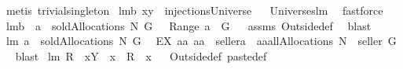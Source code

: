 \begin{isabellebody}
\ {\isacharparenleft}metis\ trivial{\isacharunderscore}singleton{\isacharparenright}%
\endisatagproof
{\isafoldproof}%
%
\isadelimproof
%
\endisadelimproof
\isanewline
{}\isamarkupfalse%
\ lm{}{}b{\isacharcolon}\ {\isachardoublequoteopen}{\isacharbraceleft}x{\isacharbraceright}{\isasymtimes}{\isacharbraceleft}y{\isacharbraceright}\ {\isasymin}\ injectionsUniverse{\isachardoublequoteclose}%
\isadelimproof
\ %
\endisadelimproof
%
\isatagproof
{}\isamarkupfalse%
\ Universes{\isachardot}lm{}{}\ \isamarkupfalse%
\ fastforce%
\endisatagproof
{\isafoldproof}%
%
\isadelimproof
%
\endisadelimproof
\isanewline
{}\isamarkupfalse%
\ lm{}{}b{\isacharcolon}\ \ {\isachardoublequoteopen}a\ {\isasymin}\ soldAllocations{\isacharprime}{\isacharprime}\ N\ G{\isachardoublequoteclose}\ \ {\isachardoublequoteopen}{\isasymUnion}\ Range\ a\ {\isasymsubseteq}\ G{\isachardoublequoteclose}%
\isadelimproof
\ %
\endisadelimproof
%
\isatagproof
{}\isamarkupfalse%
\ assms\ Outside{\isacharunderscore}def\ \isamarkupfalse%
\ blast%
\endisatagproof
{\isafoldproof}%
%
\isadelimproof
%
\endisadelimproof
\isanewline
{}\isamarkupfalse%
\ lm{}{}{\isacharcolon}\ {\isachardoublequoteopen}a\ {\isasymin}\ soldAllocations{\isacharprime}{\isacharprime}\ N\ G\ {\isacharequal}\ \isanewline
{\isacharparenleft}EX\ aa{\isachardot}\ aa\ {\isacharminus}{\isacharminus}\ {\isacharparenleft}seller{\isacharparenright}{\isacharequal}a\ {\isacharampersand}\ aa{\isasymin}allAllocations{\isacharprime}{\isacharprime}\ {\isacharparenleft}N\ {\isasymunion}\ {\isacharbraceleft}seller{\isacharbraceright}{\isacharparenright}\ G{\isacharparenright}{\isachardoublequoteclose}%
\isadelimproof
\ %
\endisadelimproof
%
\isatagproof
{}\isamarkupfalse%
\ blast%
\endisatagproof
{\isafoldproof}%
%
\isadelimproof
%
\endisadelimproof
\isanewline
\isanewline
{}\isamarkupfalse%
\ lm{}{}{\isacharcolon}\ {\isachardoublequoteopen}{\isacharparenleft}R\ {\isacharplus}{\isacharasterisk}\ {\isacharparenleft}{\isacharbraceleft}x{\isacharbraceright}{\isasymtimes}Y{\isacharparenright}{\isacharparenright}\ {\isacharminus}{\isacharminus}\ x\ {\isacharequal}\ R\ {\isacharminus}{\isacharminus}\ x{\isachardoublequoteclose}%
\isadelimproof
\ %
\endisadelimproof
%
\isatagproof
{}\isamarkupfalse%
\ Outside{\isacharunderscore}def\ paste{\isacharunderscore}def\ \isamarkupfalse%

\end{isabellebody}
